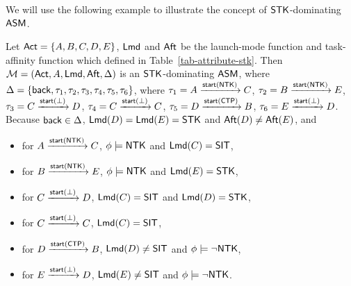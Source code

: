 \begin{example}
	We will use the following example to illustrate the concept of $\mathsf{STK}$-dominating $\textsf{ASM}$. 

Let ${\sf Act} = \{A, B, C, D, E\}$, ${\sf Lmd}$ and ${\sf Aft}$ be the launch-mode function and task-affinity function which defined in Table~\ref{tab-attribute-stk}.
Then ${\mathcal{M} }=({\sf Act},A,{\sf Lmd},{\sf Aft},\Delta)$ is an $\mathsf{STK}$-dominating $\textsf{ASM}$, where $\Delta = \{{\mathsf{back} },\tau_1, \tau_2, \tau_3, \tau_4, \tau_5, \tau_6\}$, where
		$\tau_1 = A \xrightarrow{{\mathsf{start} }({\sf NTK})} C$,
		$\tau_2 = B \xrightarrow{{\mathsf{start} }({\sf NTK})} E$,
		$\tau_3 = C \xrightarrow{{\mathsf{start} }(\bot)} D$,
		$\tau_4 = C \xrightarrow{{\mathsf{start} }(\bot)} C$,
		$\tau_5 = D \xrightarrow{{\mathsf{start} }({\sf CTP})} B$,
		$\tau_6 = E \xrightarrow{{\mathsf{start} }(\bot)} D$. 
Because ${\mathsf{back} }\in\Delta$, ${\sf Lmd}(D) = {\sf Lmd}(E) = \mathsf{STK}$ and ${\sf Aft}(D) \neq {\sf Aft}(E)$, and 
\begin{itemize}
	\item for $A \xrightarrow{{\mathsf{start} }({\sf NTK})} C$, $\phi\models{\sf NTK}$ and ${\sf Lmd}(C) = \mathsf{SIT}$,
	\item for $B \xrightarrow{{\mathsf{start} }({\sf NTK})} E$, $\phi\models{\sf NTK}$ and ${\sf Lmd}(E) = \mathsf{STK}$,
	\item for $C \xrightarrow{{\mathsf{start} }(\bot)} D$, ${\sf Lmd}(C) = \mathsf{SIT}$ and ${\sf Lmd}(D) = \mathsf{STK}$,
	\item for $C \xrightarrow{{\mathsf{start} }(\bot)} C$, ${\sf Lmd}(C) = \mathsf{SIT}$,
	\item for $D \xrightarrow{{\mathsf{start} }({\sf CTP})} B$, ${\sf Lmd}(D) \neq \mathsf{SIT}$ and $\phi\models\neg{\sf NTK}$,
	\item for $E \xrightarrow{{\mathsf{start} }(\bot)} D$, ${\sf Lmd}(E) \neq \mathsf{SIT}$ and $\phi\models\neg{\sf NTK}$.
\end{itemize}


\end{example}
